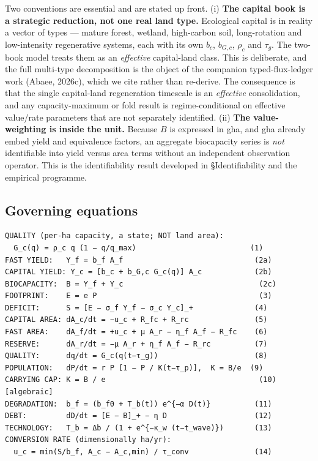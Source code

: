 \documentclass[11pt]{article}
\begin{document}
Two conventions are essential and are stated up front. (i) \textbf{The capital book is a strategic reduction, not one real land type.} Ecological capital is in reality a vector of types --- mature forest, wetland, high-carbon soil, long-rotation and low-intensity regenerative systems, each with its own $b_c$, $b_{G,c}$, $\rho_c$ and $\tau_g$. The two-book model treats them as an \emph{effective} capital-land class. This is deliberate, and the full multi-type decomposition is the object of the companion typed-flux-ledger work (Abaee, 2026c), which we cite rather than re-derive. The consequence is that the single capital-land regeneration timescale is an \emph{effective} consolidation, and any capacity-maximum or fold result is regime-conditional on effective value/rate parameters that are not separately identified. (ii) \textbf{The value-weighting is inside the unit.} Because $B$ is expressed in gha, and gha already embed yield and equivalence factors, an aggregate biocapacity series is \emph{not} identifiable into yield versus area terms without an independent observation operator. This is the identifiability result developed in \S Identifiability and the empirical programme.

\subsection{Governing equations}

\begingroup\small\begin{verbatim}
QUALITY (per-ha capacity, a state; NOT land area):
  G_c(q) = ρ_c q (1 − q/q_max)                          (1)
FAST YIELD:   Y_f = b_f A_f                              (2a)
CAPITAL YIELD: Y_c = [b_c + b_G,c G_c(q)] A_c            (2b)
BIOCAPACITY:  B = Y_f + Y_c                               (2c)
FOOTPRINT:    E = e P                                     (3)
DEFICIT:      S = [E − σ_f Y_f − σ_c Y_c]_+              (4)
CAPITAL AREA: dA_c/dt = −u_c + R_fc + R_rc               (5)
FAST AREA:    dA_f/dt = +u_c + μ A_r − η_f A_f − R_fc    (6)
RESERVE:      dA_r/dt = −μ A_r + η_f A_f − R_rc          (7)
QUALITY:      dq/dt = G_c(q(t−τ_g))                      (8)
POPULATION:   dP/dt = r P [1 − P / K(t−τ_p)],  K = B/e  (9)
CARRYING CAP: K = B / e                                   (10)  [algebraic]
DEGRADATION:  b_f = (b_f0 + T_b(t)) e^{−α D(t)}          (11)
DEBT:         dD/dt = [E − B]_+ − η D                    (12)
TECHNOLOGY:   T_b = Δb / (1 + e^{−κ_w (t−t_wave)})       (13)
CONVERSION RATE (dimensionally ha/yr):
  u_c = min(S/b_f, A_c − A_c,min) / τ_conv               (14)
\end{verbatim}\endgroup
\end{document}

